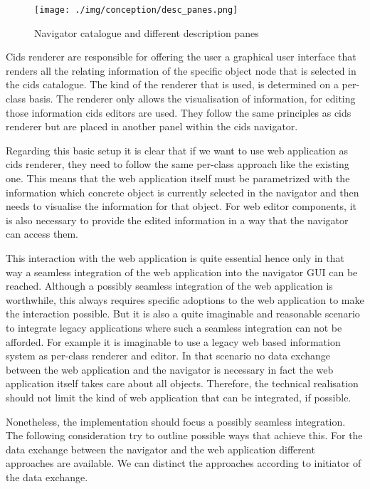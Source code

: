 \begin{figure}
	\centering \texttt{[image: ./img/conception/desc\_panes.png]}
	\caption{Navigator catalogue and different description panes}
	\label{fig:desc_panes}
\end{figure}

Cids renderer are responsible for offering the user a graphical user interface that renders all the relating information of the specific object node that is selected in the cids catalogue.
The kind of the renderer that is used, is determined on a per-class basis.
The renderer only allows the visualisation of information, for editing those information cids editors are used.
They follow the same principles as cids renderer but are placed in another panel within the cids navigator.

Regarding this basic setup it is clear that if we want to use  web application  as cids renderer, they need to follow the same per-class approach like the existing one.
This means that the web application itself must be parametrized with the information which concrete object is currently selected in the navigator and then needs to visualise the information for that object.
For web editor components, it is also necessary to provide the edited information in a way that the navigator can access them.

This interaction with the web application is quite essential hence only in that way a seamless integration of the web application into the navigator GUI can be reached.
Although a possibly seamless integration of the web application is worthwhile, this always requires specific adoptions to the web application to make the interaction possible.
But it is also a quite imaginable and reasonable scenario to integrate legacy applications where such a seamless integration can not be afforded.
For example it is imaginable to use a legacy web based information system as per-class renderer and editor.
In that scenario no data exchange between the web application and the navigator is necessary in fact the web application itself takes care about all objects.
Therefore, the technical realisation should not limit the kind of web application that can be integrated, if possible.

Nonetheless, the implementation should focus a possibly seamless integration.
The following consideration  try to outline possible ways that achieve this.
For the data exchange between the navigator and the web application different approaches are available.
We can distinct the approaches according to  initiator of the data exchange.

